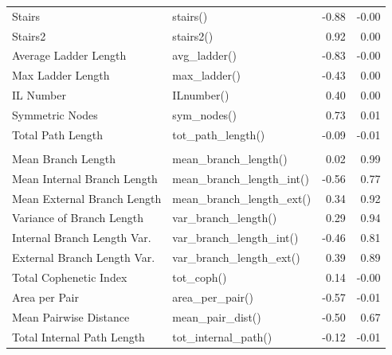 \begin{table}
\begin{tabular}[t]{llrr}
\hspace{1em}Stairs & stairs() & -0.88 & -0.00\\
\hspace{1em}Stairs2 & stairs2() & 0.92 & 0.00\\
\hspace{1em}Average Ladder Length & avg\_ladder() & -0.83 & -0.00\\
\hspace{1em}Max Ladder Length & max\_ladder() & -0.43 & 0.00\\
\hspace{1em}IL Number & ILnumber() & 0.40 & 0.00\\
\hspace{1em}Symmetric Nodes & sym\_nodes() & 0.73 & 0.01\\
\hspace{1em}Total Path Length & tot\_path\_length() & -0.09 & -0.01\\
\addlinespace[0.3em]
\multicolumn{4}{l}{\textbf{Branch Length \& Distance}}\\
\hspace{1em}Mean Branch Length & mean\_branch\_length() & 0.02 & 0.99\\
\hspace{1em}Mean Internal Branch Length & mean\_branch\_length\_int() & -0.56 & 0.77\\
\hspace{1em}Mean External Branch Length & mean\_branch\_length\_ext() & 0.34 & 0.92\\
\hspace{1em}Variance of Branch Length & var\_branch\_length() & 0.29 & 0.94\\
\hspace{1em}Internal Branch Length Var. & var\_branch\_length\_int() & -0.46 & 0.81\\
\hspace{1em}External Branch Length Var. & var\_branch\_length\_ext() & 0.39 & 0.89\\
\hspace{1em}Total Cophenetic Index & tot\_coph() & 0.14 & -0.00\\
\hspace{1em}Area per Pair & area\_per\_pair() & -0.57 & -0.01\\
\hspace{1em}Mean Pairwise Distance & mean\_pair\_dist() & -0.50 & 0.67\\
\hspace{1em}Total Internal Path Length & tot\_internal\_path() & -0.12 & -0.01\\

\end{tabular}
\end{table}
